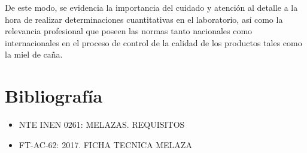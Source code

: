 \documentclass[a4paper,12pt]{article} %
\begin{document}
De este modo, se evidencia la importancia del cuidado y atención al detalle a la hora de realizar determinaciones cuantitativas en el laboratorio, así como la relevancia profesional que poseen las normas tanto nacionales como internacionales en el proceso de control de la calidad de los productos tales como la miel de caña.

\section{Bibliografía}
\begin{itemize}
    \item NTE INEN 0261: MELAZAS. REQUISITOS
    \item FT-AC-62: 2017. FICHA TECNICA MELAZA
\end{itemize}
\end{document}
